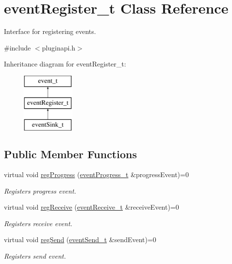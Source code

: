 \hypertarget{classeventRegister__t}{\section{event\-Register\-\_\-t \-Class \-Reference}
\label{classeventRegister__t}
}


\-Interface for registering events.  




{\ttfamily \#include $<$pluginapi.\-h$>$}

\-Inheritance diagram for event\-Register\-\_\-t\-:\begin{figure}[H]
\begin{center}
\leavevmode
\includegraphics[height=3.000000cm]{classeventRegister__t}
\end{center}
\end{figure}
\subsection*{\-Public \-Member \-Functions}
\begin{DoxyCompactItemize}
\item 
virtual void \hyperlink{classeventRegister__t_a807110b926e683f81a880ddfd897823a}{reg\-Progress} (\hyperlink{classeventProgress__t}{event\-Progress\-\_\-t} \&progress\-Event)=0
\begin{DoxyCompactList}\small\item\em \-Registers progress event. \end{DoxyCompactList}\item 
virtual void \hyperlink{classeventRegister__t_a1aac317213afabb70d939c91b7ea2848}{reg\-Receive} (\hyperlink{classeventReceive__t}{event\-Receive\-\_\-t} \&receive\-Event)=0
\begin{DoxyCompactList}\small\item\em \-Registers receive event. \end{DoxyCompactList}\item 
virtual void \hyperlink{classeventRegister__t_ab918520e178622864c7cff50336ac70e}{reg\-Send} (\hyperlink{classeventSend__t}{event\-Send\-\_\-t} \&send\-Event)=0
\begin{DoxyCompactList}\small\item\em \-Registers send event. \end{DoxyCompactList}\end{DoxyCompactItemize}


